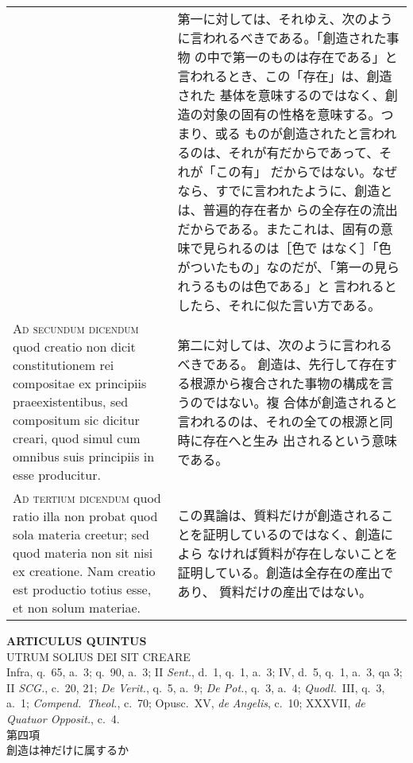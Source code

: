 \documentclass[10pt]{jsarticle} %
\begin{document}
\begin{longtable}{p{21em}p{21em}}
&

第一に対しては、それゆえ、次のように言われるべきである。「創造された事物
の中で第一のものは存在である」と言われるとき、この「存在」は、創造された
基体を意味するのではなく、創造の対象の固有の性格を意味する。つまり、或る
ものが創造されたと言われるのは、それが有だからであって、それが「この有」
だからではない。なぜなら、すでに言われたように、創造とは、普遍的存在者か
らの全存在の流出だからである。またこれは、固有の意味で見られるのは［色で
はなく］「色がついたもの」なのだが、「第一の見られうるものは色である」と
言われるとしたら、それに似た言い方である。


\\


{\scshape Ad secundum dicendum} quod creatio non dicit constitutionem
rei compositae ex principiis praeexistentibus, sed compositum sic
dicitur creari, quod simul cum omnibus suis principiis in esse
producitur.

&
第二に対しては、次のように言われるべきである。
創造は、先行して存在する根源から複合された事物の構成を言うのではない。複
 合体が創造されると言われるのは、それの全ての根源と同時に存在へと生み
 出されるという意味である。


\\


{\scshape Ad tertium dicendum} quod ratio illa non
probat quod sola materia creetur; sed quod materia non sit nisi ex
creatione. Nam creatio est productio totius esse, et non solum materiae.

&

この異論は、質料だけが創造されることを証明しているのではなく、創造によら
 なければ質料が存在しないことを証明している。創造は全存在の産出であり、
 質料だけの産出ではない。



\end{longtable}
\newpage





\begin{center}
 {\Large {\bf ARTICULUS QUINTUS}}\\
 {\large UTRUM SOLIUS DEI SIT CREARE}\\
 {\footnotesize Infra, q.~65, a.~3; q.~90, a.~3; II {\itshape Sent.},
 d.~1, q.~1, a.~3; IV, d.~5, q.~1, a.~3, qa 3; II {\itshape SCG.},
 c.~20, 21; {\itshape De Verit.}, q.~5, a.~9; {\itshape De Pot.}, q.~3,
 a.~4; {\itshape Quodl.}~III, q.~3, a.~1; {\itshape Compend.~Theol.},
 c.~70; Opusc.~XV, {\itshape de Angelis}, c.~10; XXXVII, {\itshape de
 Quatuor Opposit.}, c.~4.}\\
 {\Large 第四項\\創造は神だけに属するか}
\end{center}
\end{document}
